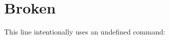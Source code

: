 \documentclass{article}
\begin{document}
\section{Broken}
This line intentionally uses an undefined command: \texnologiabrokencommand
\end{document}
